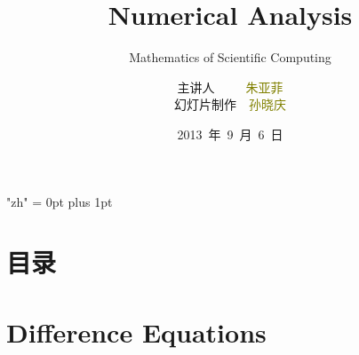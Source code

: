 \documentclass[notheorems,mathserif,table,compress]{beamer}  %
\begin{document}
\XeTeXlinebreaklocale "zh"         %
\XeTeXlinebreakskip = 0pt plus 1pt %
\title[Numerical Analysis]{Numerical Analysis}
\subtitle{Mathematics of Scientific Computing}
\author[qiu]{主讲人~~~~~\textcolor{olive}{朱亚菲}\\
    \quad 幻灯片制作~~\textcolor{olive}{孙晓庆}}
\institute[中国海洋大学]{\small\textcolor{violet}{中国海洋大学~~信息科学与工程学院}}
\date{2013~年~9~月~6~日}
\frame{ \titlepage }
\section*{目录}
\section{Difference Equations}
\end{document}
